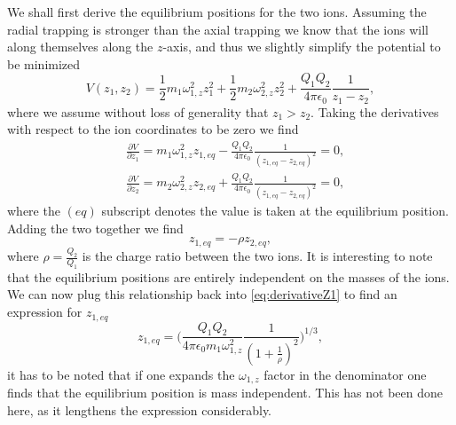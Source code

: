 We shall first derive the equilibrium positions for the two ions. Assuming the radial trapping is stronger than the axial trapping we know that the ions will along themselves along the $z$-axis, and thus we slightly simplify the potential to be minimized
\begin{equation}
    V(z_1,z_2) = \frac{1}{2}m_1\omega_{1,z}^2z_1^2 + \frac{1}{2}m_2\omega_{2,z}^2z_2^2 + \frac{Q_1Q_2}{4\pi\epsilon_0}\frac{1}{z_1-z_2},
\end{equation}
where we assume without loss of generality that $z_1>z_2$. Taking the derivatives with respect to the ion coordinates to be zero we find
\begin{align}
    &\frac{\partial V}{\partial z_{1}} = m_1\omega_{1,z}^2z_{1,eq} - \frac{Q_1Q_2}{4\pi\epsilon_0}\frac{1}{(z_{1,eq}-z_{2,eq})^2}  = 0\label{eq:derivativeZ1},\\
    &\frac{\partial V}{\partial z_{2}} = m_2\omega_{2,z}^2z_{2,eq} + \frac{Q_1Q_2}{4\pi\epsilon_0}\frac{1}{(z_{1,eq}-z_{2,eq})^2} = 0,
\end{align}
where the $(eq)$ subscript denotes the value is taken at the equilibrium position. Adding the two together we find
\begin{equation}
    z_{1,eq} = -\rho z_{2,eq},
\end{equation}
where $\rho = \frac{Q_2}{Q_1}$ is the charge ratio between the two ions. It is interesting to note that the equilibrium positions are entirely independent on the masses of the ions.
We can now plug this relationship back into \cref{eq:derivativeZ1} to find an expression for $z_{1,eq}$
\begin{equation}
    z_{1,eq} =\bigg(\frac{Q_1Q_2}{4\pi\epsilon_0m_1\omega_{1,z}^2}\frac{1}{(1+\frac{1}{\rho})^2}\bigg)^{1/3},
\end{equation}
it has to be noted that if one expands the $\omega_{1,z}$ factor in the denominator one finds that the equilibrium position is mass independent. This has not been done here, as it lengthens the expression considerably.

